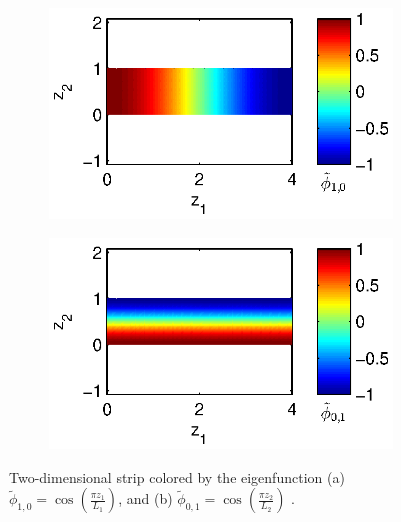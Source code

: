 \documentclass[preprint]{elsarticle}
\begin{document}
\begin{figure}[t]
\begin{subfigure}{0.5\textwidth}
\includegraphics[width=\textwidth]{strip_cnts1}
\end{subfigure}
\begin{subfigure}{0.5\textwidth}
\includegraphics[width=\textwidth]{strip_cnts2}
\end{subfigure}
\caption{Two-dimensional strip colored by the eigenfunction (a) $\tilde{\phi}_{1, 0} = \cos \left( \frac{\pi z_1}{L_1} \right)$, and (b) $\tilde{\phi}_{0, 1} = \cos \left( \frac{\pi z_2}{L_2} \right)$ .}
\label{fig:strip_efuncs}
\end{figure}


\end{document}
